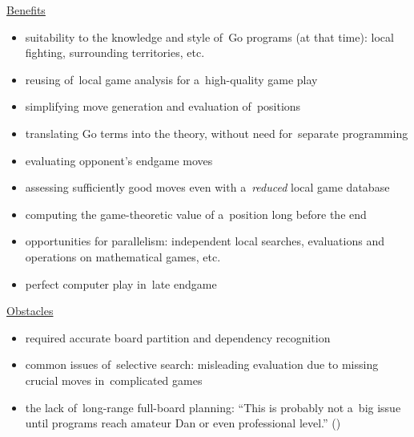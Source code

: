 \underline{Benefits}
\begin{itemize}[+]
  \item suitability to the knowledge and style of~Go programs (at that time):
    local fighting, surrounding territories, etc.
  \item reusing of~local game analysis for a~high-quality game play
  \item simplifying move generation and evaluation of~positions
  \item translating Go terms into the theory, without need for~separate programming
  \item evaluating opponent's endgame moves
  \item assessing sufficiently good moves even with a~\emph{reduced} local game database
  \item computing the game-theoretic value of a~position long before the end
  \item opportunities for parallelism:
    independent local searches, evaluations and operations on mathematical games, etc.
  \item perfect computer play in~late endgame
\end{itemize}

\newpage

\underline{Obstacles}
\begin{itemize}[-]
  \item required accurate board partition and dependency recognition
  \item common issues of~selective search:
    misleading evaluation due to missing crucial moves in~complicated games
  \item the lack of~long-range full-board planning:
    ``This is probably not a~big issue until programs reach amateur Dan or even professional level.''
    (\cite{Muller1995computer})
\end{itemize}


